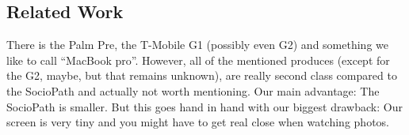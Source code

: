 %
%
%
\subsection{Related Work}

There is the Palm Pre, the T-Mobile G1 (possibly even G2) and something we like to call ``MacBook pro''.
However, all of the mentioned produces (except for the G2, maybe, but that remains unknown), are really second class
compared to the SocioPath and actually not worth mentioning. Our main advantage: The SocioPath is smaller.
But this goes hand in hand with our biggest drawback: Our screen is very tiny and you might have to get real close
when watching photos.

